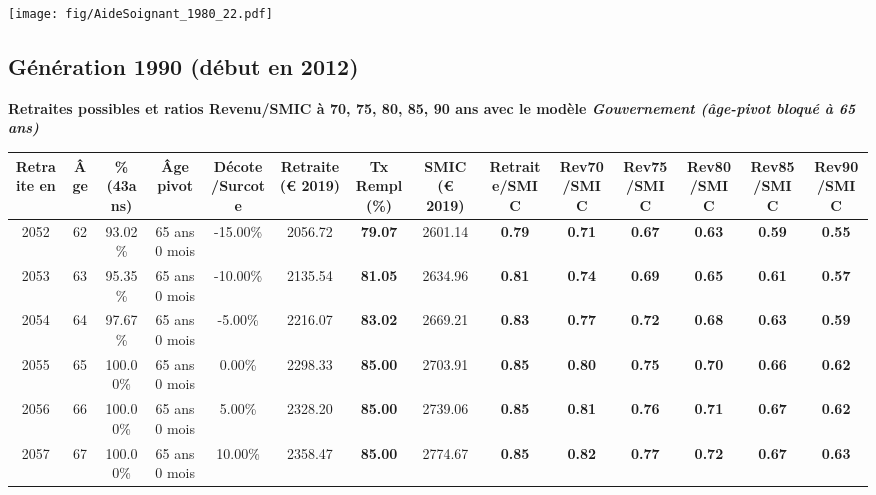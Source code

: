  \vspace{0.1cm} 

 \begin{center}\texttt{[image: fig/AideSoignant\_1980\_22.pdf]}\end{center} \label{fig/AideSoignant_1980_22.pdf} 

\newpage 
 
\subsection{Génération 1990 (début en 2012)} 

{\bf \noindent Retraites possibles et ratios Revenu/SMIC à 70, 75, 80, 85, 90 ans avec le modèle \emph{Gouvernement (âge-pivot bloqué à 65 ans)}}  
 
\begin{adjustbox}{max width=\textwidth} 
\begin{tabular}[htb]{|c|c||c|c|c||c|c||c||c|c|c|c|c|c|} 
\hline 
 Retraite en &  Âge &  \%(43ans) &  Âge pivot &  Décote/Surcote &  Retraite (\euro{} 2019) &  Tx Rempl(\%) &  SMIC (\euro{} 2019) &  Retraite/SMIC &  Rev70/SMIC &  Rev75/SMIC &  Rev80/SMIC &  Rev85/SMIC &  Rev90/SMIC \\ 
\hline \hline 
 2052 &  62 &  93.02\% &  65 ans 0 mois &  -15.00\% &  2056.72 &  {\bf 79.07} &  2601.14 &  {\bf {\color{red} 0.79}} &  {\bf {\color{red} 0.71}} &  {\bf {\color{red} 0.67}} &  {\bf {\color{red} 0.63}} &  {\bf {\color{red} 0.59}} &  {\bf {\color{red} 0.55}} \\ 
\hline 
 2053 &  63 &  95.35\% &  65 ans 0 mois &  -10.00\% &  2135.54 &  {\bf 81.05} &  2634.96 &  {\bf {\color{red} 0.81}} &  {\bf {\color{red} 0.74}} &  {\bf {\color{red} 0.69}} &  {\bf {\color{red} 0.65}} &  {\bf {\color{red} 0.61}} &  {\bf {\color{red} 0.57}} \\ 
\hline 
 2054 &  64 &  97.67\% &  65 ans 0 mois &  -5.00\% &  2216.07 &  {\bf 83.02} &  2669.21 &  {\bf {\color{red} 0.83}} &  {\bf {\color{red} 0.77}} &  {\bf {\color{red} 0.72}} &  {\bf {\color{red} 0.68}} &  {\bf {\color{red} 0.63}} &  {\bf {\color{red} 0.59}} \\ 
\hline 
 2055 &  65 &  100.00\% &  65 ans 0 mois &  0.00\% &  2298.33 &  {\bf 85.00} &  2703.91 &  {\bf {\color{red} 0.85}} &  {\bf {\color{red} 0.80}} &  {\bf {\color{red} 0.75}} &  {\bf {\color{red} 0.70}} &  {\bf {\color{red} 0.66}} &  {\bf {\color{red} 0.62}} \\ 
\hline 
 2056 &  66 &  100.00\% &  65 ans 0 mois &  5.00\% &  2328.20 &  {\bf 85.00} &  2739.06 &  {\bf {\color{red} 0.85}} &  {\bf {\color{red} 0.81}} &  {\bf {\color{red} 0.76}} &  {\bf {\color{red} 0.71}} &  {\bf {\color{red} 0.67}} &  {\bf {\color{red} 0.62}} \\ 
\hline 
 2057 &  67 &  100.00\% &  65 ans 0 mois &  10.00\% &  2358.47 &  {\bf 85.00} &  2774.67 &  {\bf {\color{red} 0.85}} &  {\bf {\color{red} 0.82}} &  {\bf {\color{red} 0.77}} &  {\bf {\color{red} 0.72}} &  {\bf {\color{red} 0.67}} &  {\bf {\color{red} 0.63}} \\ 
\hline 
\hline 
\end{tabular} 
\end{adjustbox} 
 

